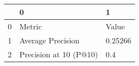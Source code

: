 \begin{tabular}{lll}
\toprule
{} &                       0 &        1 \\
\midrule
0 &                  Metric &    Value \\
1 &       Average Precision &  0.25266 \\
2 &  Precision at 10 (P@10) &      0.4 \\
\bottomrule
\end{tabular}
